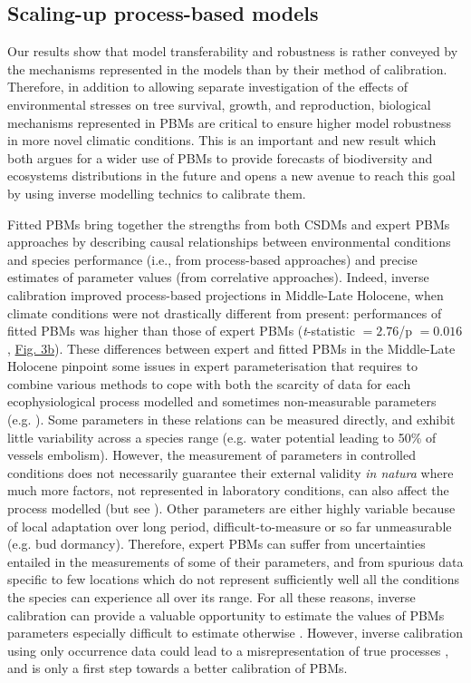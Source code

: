 \documentclass[pdflatex, sn-nature]{sn-jnl}%
\begin{document}
\begin{figure}[ht]
\end{figure}

\subsection{Scaling-up process-based models}

Our results show that model transferability and robustness is rather conveyed by the mechanisms represented in the models than by their method of calibration. Therefore, in addition to allowing separate investigation of the effects of environmental stresses on tree survival, growth, and reproduction, biological mechanisms represented in PBMs are critical to ensure higher model robustness in more novel climatic conditions. This is an important and new result which both argues for a wider use of PBMs to provide forecasts of biodiversity and ecosystems distributions in the future and opens a new avenue  to reach this goal by using inverse modelling technics to calibrate them.

Fitted PBMs bring together the strengths from both CSDMs and expert PBMs approaches by describing causal relationships between environmental conditions and species performance (i.e., from process-based approaches) and precise estimates of parameter values (from correlative approaches). Indeed, inverse calibration improved process-based projections in Middle-Late Holocene, when climate conditions were not  drastically different from present: performances of fitted PBMs was higher than those of expert PBMs (\emph{t}-statistic $=2.76$/p $=0.016$, \hyperref[past_performance]{Fig. 3b}). These differences between expert and fitted PBMs in the Middle-Late Holocene pinpoint some issues in expert parameterisation that requires to combine various methods to cope with both the scarcity of data for each ecophysiological process modelled and sometimes non-measurable parameters (e.g. \citep{DeCaceres2023}).  Some parameters in these relations can be measured directly, and exhibit little variability across a species range (e.g. water potential leading to 50\% of vessels embolism). However, the measurement of parameters in controlled conditions does not necessarily guarantee their external validity \emph{in natura} \cite{Asse2020} where much more factors, not represented in laboratory conditions, can also affect the process modelled (but see \cite{Satake2013}). Other parameters are either highly variable because of local adaptation over long period,  difficult-to-measure or so far unmeasurable (e.g. bud dormancy). Therefore, expert PBMs can suffer from uncertainties entailed in the measurements of some of their parameters, and from spurious data specific to few locations which do not represent sufficiently well all the conditions the species can experience all over its range. For all these reasons, inverse calibration can provide a valuable opportunity to estimate the values of PBMs parameters especially difficult to estimate otherwise \cite{Evans2016, Hartig2014}. However, inverse calibration using only occurrence data could lead to a misrepresentation of true processes \cite{VanderMeersch2023}, and is only a first step towards a better calibration of PBMs. 
\end{document}
